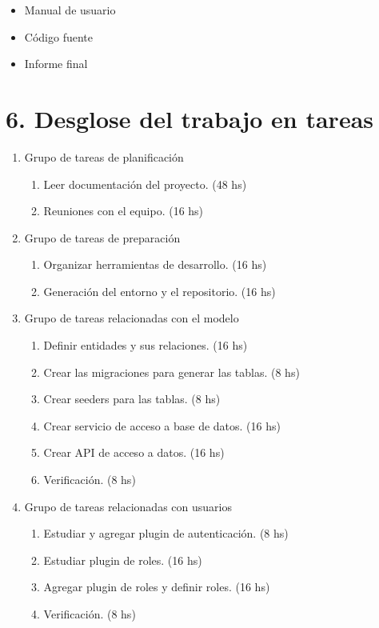 \documentclass[11pt]{charter}
\begin{document}
\begin{itemize}
\item Manual de usuario
\item Código fuente
\item Informe final
\end{itemize}

\section{6. Desglose del trabajo en tareas}
\label{sec:wbs}

\begin{enumerate}
\item Grupo de tareas de planificación
	\begin{enumerate}
	\item Leer documentación del proyecto. (48 hs)
	\item Reuniones con el equipo. (16 hs)
	\end{enumerate}

\item Grupo de tareas de preparación
	\begin{enumerate}
	\item Organizar herramientas de desarrollo. (16 hs)
	\item Generación del entorno y el repositorio. (16 hs)
	\end{enumerate}

\item Grupo de tareas relacionadas con el modelo
	\begin{enumerate}
	\item Definir entidades y sus relaciones. (16 hs)
	\item Crear las migraciones para generar las tablas. (8 hs)
	\item Crear seeders para las tablas. (8 hs)
	\item Crear servicio de acceso a base de datos. (16 hs)
	\item Crear API de acceso a datos. (16 hs)
	\item Verificación. (8 hs)
	\end{enumerate}

\item Grupo de tareas relacionadas con usuarios
	\begin{enumerate}
	\item Estudiar y agregar plugin de autenticación. (8 hs)
	\item Estudiar plugin de roles. (16 hs)
	\item Agregar plugin de roles y definir roles. (16 hs)
	\item Verificación. (8 hs)
	\end{enumerate}


\end{enumerate}
\end{document}
